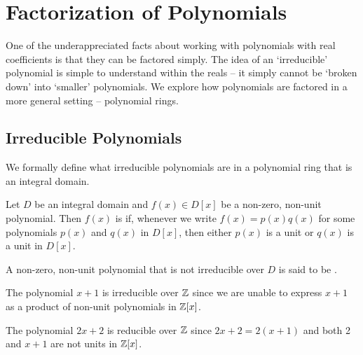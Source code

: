 \chapter{Factorization of Polynomials}
One of the underappreciated facts about working with polynomials with real coefficients is that they can be factored simply. The idea of an `irreducible' polynomial is simple to understand within the reals -- it simply cannot be `broken down' into `smaller' polynomials. We explore how polynomials are factored in a more general setting -- polynomial rings.

\section{Irreducible Polynomials}
We formally define what irreducible polynomials are in a polynomial ring that is an integral domain.
\begin{definition}
    Let $D$ be an integral domain and $f(x) \in D[x]$ be a non-zero, non-unit polynomial. Then $f(x)$ is  if, whenever we write $f(x) = p(x)q(x)$ for some polynomials $p(x)$ and $q(x)$ in $D[x]$, then either $p(x)$ is a unit or $q(x)$ is a unit in $D[x]$.

    A non-zero, non-unit polynomial that is not irreducible over $D$ is said to be .
\end{definition}

\begin{example}
    The polynomial $x + 1$ is irreducible over $\mathbb{Z}$ since we are unable to express $x+1$ as a product of non-unit polynomials in $\mathbb{Z}[x]$.
\end{example}

\begin{example}
    The polynomial $2x + 2$ is reducible over $\mathbb{Z}$ since $2x+2 = 2(x+1)$ and both 2 and $x+1$ are not units in $\mathbb{Z}[x]$.
\end{example}

